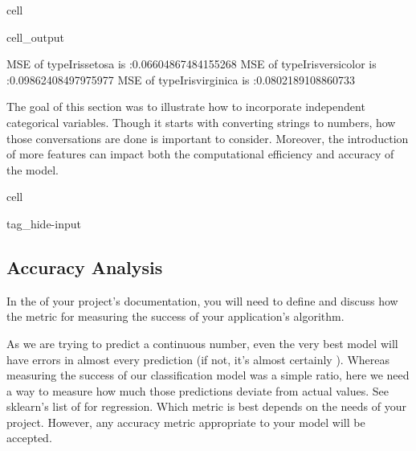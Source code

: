 \documentclass[letterpaper,10pt,english]{jupyterBook}
\begin{document}
\begin{sphinxuseclass}{cell}
\begin{sphinxVerbatimOutput}
\begin{sphinxuseclass}{cell_output}
\begin{sphinxVerbatim}[commandchars=\\\{\}]
MSE of type\PYGZus{}Iris\PYGZhy{}setosa is :0.06604867484155268
MSE of type\PYGZus{}Iris\PYGZhy{}versicolor is :0.09862408497975977
MSE of type\PYGZus{}Iris\PYGZhy{}virginica is :0.0802189108860733
\end{sphinxVerbatim}

\end{sphinxuseclass}\end{sphinxVerbatimOutput}

\end{sphinxuseclass}
\sphinxAtStartPar
The goal of this section was to illustrate how to incorporate independent categorical variables. Though it starts with converting strings to numbers, how those conversations are done is important to consider. Moreover, the introduction of more features can impact both the computational efficiency and accuracy of the model.

\sphinxstepscope

\begin{sphinxuseclass}{cell}
\begin{sphinxuseclass}{tag_hide-input}
\end{sphinxuseclass}
\end{sphinxuseclass}

\subsection{Accuracy Analysis}
\label{\detokenize{task2_c/example_sup_reg/sup_reg_ex_accuracy:accuracy-analysis}}\label{\detokenize{task2_c/example_sup_reg/sup_reg_ex_accuracy:sup-reg-ex-develop-accuracy}}\label{\detokenize{task2_c/example_sup_reg/sup_reg_ex_accuracy::doc}}
\sphinxAtStartPar
In the  of your project’s documentation, you will need to define and discuss how the metric for measuring the success of your application’s algorithm.

\sphinxAtStartPar
As we are trying to predict a continuous number, even the very best model will have errors in almost every prediction (if not, it’s almost certainly ). Whereas measuring the success of our classification model was a simple ratio, here we need a way to measure how much those predictions deviate from actual values. See sklearn’s list of  for regression. Which metric is best depends on the needs of your project. However, any accuracy metric appropriate to your model will be accepted.
\end{document}
